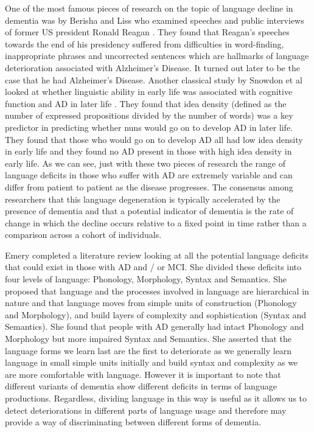 \documentclass[10pt, letterpaper, twoside, openany]{book}
\begin{document}
\par
One of the most famous pieces of research on the topic of language decline in dementia was by Berisha and Liss who examined speeches and public interviews of former US president Ronald Reagan \cite{Berisha2015}. They found that Reagan's speeches towards the end of his presidency suffered from difficulties in word-finding, inappropriate phrases and uncorrected sentences which are hallmarks of language deterioration associated with Alzheimer's Disease. It turned out later to be the case that he had Alzheimer's Disease. Another classical study by Snowdon et al looked at whether linguistic ability in early life was associated with cognitive function and AD in later life \cite{Snowdon1996} . They found that idea density (defined as the number of expressed propositions divided by the number of words) was a key predictor in predicting whether nuns would go on to develop AD in later life. They found that those who would go on to develop AD all had low idea density in early life and they found no AD present in those with high idea density in early life. As we can see, just with these two pieces of research the range of language deficits in those who suffer with AD are extremely variable and can differ from patient to patient as the disease progresses. The consensus among researchers that this language degeneration is typically accelerated by the presence of dementia \cite{Berisha2015} and that a potential indicator of dementia is the rate of change in which the decline occurs relative to a fixed point in time rather than a comparison across a cohort of individuals. 
\par
Emery \cite{Emery2000} completed a literature review looking at all the potential language deficits that could exist in those with AD and / or MCI. She divided these deficits into four levels of language: Phonology, Morphology, Syntax and Semantics. She proposed that language and the processes involved in language are hierarchical in nature and that language moves from simple units of construction (Phonology and Morphology), and build layers of complexity and sophistication (Syntax and Semantics). She found that people with AD generally had intact Phonology and Morphology but more impaired Syntax and Semantics. She asserted that the language forms we learn last are the first to deteriorate as we generally learn language in small simple units initially and build syntax and complexity as we are more comfortable with language. However it is important to note that different variants of dementia show different deficits in terms of language productions. Regardless, dividing language in this way is useful as it allows us to detect deteriorations in different parts of language usage and therefore may provide a way of discriminating between different forms of dementia. 
\end{document}
